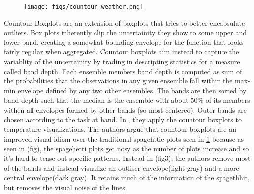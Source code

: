 \begin{figure}
\texttt{[image: figs/countour\_weather.png]}
\label{fig:countour}
\end{figure}
Countour Boxplots \cite{whitaker13} are an extension of boxplots that tries to better encapsulate outliers. Box plots inherently clip the uncertainity they show to some upper and lower band, 
creating a somewhat bounding envelope for the function that looks fairly regular when aggregated. Countour boxplots aim instead to capture the variablity of the uncertainity by trading in descripting
statistics for a measure called band depth. Each ensemble members band depth is computed as sum of the probabilities that the observations in any given ensemble fall within the max-min envelope defined by any two other ensembles. The bands are then sorted by band depth such that the median is the ensemble with about 50\% of its members withen all envelopes formed by other bands (so most centered). Outer bands are chosen according to the task at hand. In \cite{whitaker13}, they apply the countour boxplots to temperature visualizations. %
The authors argue that countour boxplots are an improved visual idiom over the traditional spagehttie plots seen in \ref{fig:countour} because as seen in (fig), the spagehetti plots get nosy as the number of plots increase and so it's hard to tease out specific patterns. Instead in (fig3), the authors remove most of the bands and instead visualize an outliser envelope(light gray) and a more central envelope(dark gray). It retains much of the information of the spagethhit, but removes the visual noise of the lines.  
